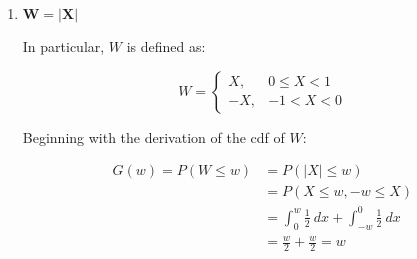 \documentclass[10pt, oneside]{article}   	%
\theoremstyle{definition}
\newtheorem*{thm}{Theorem}
\begin{document}
\begin{enumerate}[label=5.\arabic*]
\begin{enumerate}
	Analogously, we must determine the derivative of the inverse cosine function before proceeding.
	
	\begin{thm}
	\[ \frac{d}{dx} \cos^{-1}(x) = - \frac{1}{\sqrt{1 - x^2}} \]
	\end{thm}
	
	\begin{proof}
	Since $\cos (\cos^{-1} (x)) = x$, it follows that $\frac{d}{dx} \cos (\cos^{-1} (x)) = \frac{d}{dx} x$, implying $-\sin( \cos^{-1} (x)) \frac{d}{dx} \cos^{-1} (x) = 1$. Then $\frac{d}{dx} \cos^{-1}(x) = -\frac{1}{\sin(\cos^{-1} (x))}$. Since $\sin^2 y + \cos^2 y = 1$ implies $\sin y = \sqrt{1 - \cos^2 y}$, we have $\frac{d}{dx} \cos^{-1}(x) = -\frac{1}{\sqrt{1 - \cos^2 (\cos^{-1} (x))}} = -\frac{1}{\sqrt{1-x^2}}$.
	\end{proof}
	
	Differentiating $G(z)$ with respect to $z$ yields the pdf of $Z$:
	
	\[ G'(z) = g(z) = \frac{d}{dz} \Big( -\frac{2}{\pi} \cos^{-1} (z) + 1 \Big) = \boxed{\frac{2}{\pi} \frac{1}{\sqrt{1 - z^2}}} \]
	
	For $Z = \cos(\pi X / 2)$ on $-1 < X < 1$, the distribution of $Z$ is over $0 < Z < 1$. Then $g(z) \geq 0$ on that interval. Moreover, $\int^1_0 \frac{2}{\pi} \frac{1}{\sqrt{1 - z^2}} \ dz = \boxed{1}$, ascertaining $g(z)$ is a pdf.
	
	Because $Z = \cos(\pi X / 2)$ is not monotonic over $-1 < X < 1$, we cannot apply Theorem 5.1 to derive the pdf of $Z$.
	
	\item  \begin{tcolorbox}[
	  colback=Cerulean!5!white,
	  colframe=Cerulean!75!black]
	\textbf{$\bm{W = |X|} $}
	\end{tcolorbox}
	
	In particular, $W$ is defined as:
	
	\[ W = \begin{cases} 
	X, & 0 \leq X < 1 \\
	-X, & -1 < X < 0
	\end{cases}\]
	
	Beginning with the derivation of the cdf of $W$:
	
	\begin{align*}
	G(w) = P(W \leq w) &= P(|X| \leq w) \\
	&= P(X \leq w, -w \leq X) \\
	&= \int^w_0 \frac{1}{2} \ dx + \int^0_{-w} \frac{1}{2} \ dx \\
	&= \frac{w}{2} + \frac{w}{2} = w
	\end{align*}
	

\end{enumerate}
\end{enumerate}
\end{document}
